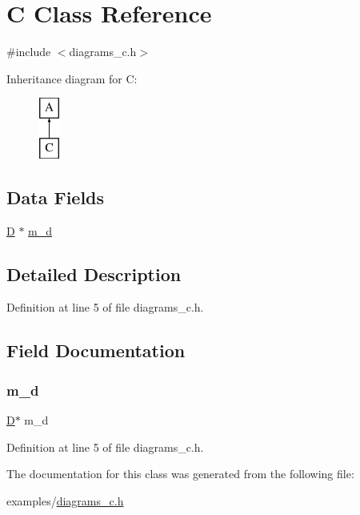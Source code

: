 \hypertarget{class_c}{}\section{C Class Reference}
\label{class_c}


{\ttfamily \#include $<$diagrams\+\_\+c.\+h$>$}

Inheritance diagram for C\+:\begin{figure}[H]
\begin{center}
\leavevmode
\includegraphics[height=2.000000cm]{class_c}
\end{center}
\end{figure}
\subsection*{Data Fields}
\begin{DoxyCompactItemize}
\item 
\hyperlink{class_d}{D} $\ast$ \hyperlink{class_c_ae04072c75ba8f2a27c527e7c37213361}{m\+\_\+d}
\end{DoxyCompactItemize}


\subsection{Detailed Description}


Definition at line 5 of file diagrams\+\_\+c.\+h.



\subsection{Field Documentation}
\mbox{\label{class_c_ae04072c75ba8f2a27c527e7c37213361}} 
\subsubsection{\texorpdfstring{m\+\_\+d}{m\_d}}
{\footnotesize\ttfamily \hyperlink{class_d}{D}$\ast$ m\+\_\+d}



Definition at line 5 of file diagrams\+\_\+c.\+h.



The documentation for this class was generated from the following file\+:\begin{DoxyCompactItemize}
\item 
examples/\hyperlink{diagrams__c_8h}{diagrams\+\_\+c.\+h}\end{DoxyCompactItemize}
